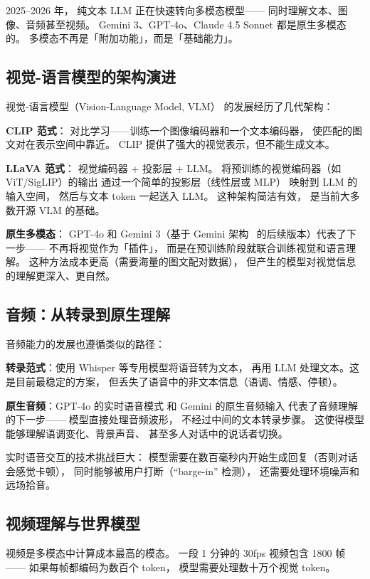 2025--2026 年，
纯文本 LLM 正在快速转向多模态模型——
同时理解文本、图像、音频甚至视频。
Gemini 3、GPT-4o、Claude 4.5 Sonnet 都是原生多模态的。
多模态不再是「附加功能」，而是「基础能力」。

\subsection{视觉-语言模型的架构演进}

视觉-语言模型（Vision-Language Model, VLM）
的发展经历了几代架构：

\textbf{CLIP 范式}：
对比学习——训练一个图像编码器和一个文本编码器，
使匹配的图文对在表示空间中靠近。
CLIP 提供了强大的视觉表示，但不能生成文本。

\textbf{LLaVA 范式}：
视觉编码器 + 投影层 + LLM。
将预训练的视觉编码器（如 ViT/SigLIP）的输出
通过一个简单的投影层（线性层或 MLP）
映射到 LLM 的输入空间，
然后与文本 token 一起送入 LLM。
这种架构简洁有效，
是当前大多数开源 VLM 的基础。

\textbf{原生多模态}：
GPT-4o 和 Gemini 3（基于 Gemini 架构~\cite{anil2023gemini} 的后续版本）代表了下一步——
不再将视觉作为「插件」，
而是在预训练阶段就联合训练视觉和语言理解。
这种方法成本更高（需要海量的图文配对数据），
但产生的模型对视觉信息的理解更深入、更自然。

\subsection{音频：从转录到原生理解}

音频能力的发展也遵循类似的路径：

\textbf{转录范式}：使用 Whisper 等专用模型将语音转为文本，
再用 LLM 处理文本。这是目前最稳定的方案，
但丢失了语音中的非文本信息（语调、情感、停顿）。

\textbf{原生音频}：GPT-4o 的实时语音模式
和 Gemini 的原生音频输入
代表了音频理解的下一步——
模型直接处理音频波形，
不经过中间的文本转录步骤。
这使得模型能够理解语调变化、背景声音、
甚至多人对话中的说话者切换。

实时语音交互的技术挑战巨大：
模型需要在数百毫秒内开始生成回复（否则对话会感觉卡顿），
同时能够被用户打断（``barge-in'' 检测），
还需要处理环境噪声和远场拾音。

\subsection{视频理解与世界模型}

视频是多模态中计算成本最高的模态。
一段 1 分钟的 30fps 视频包含 1800 帧——
如果每帧都编码为数百个 token，
模型需要处理数十万个视觉 token。

